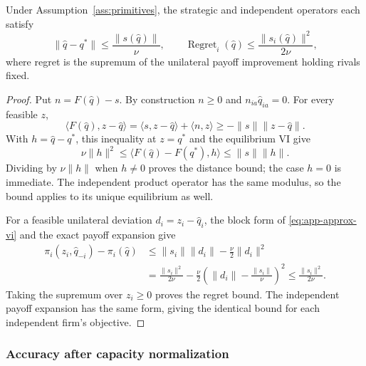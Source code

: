 \begin{proposition}\label{prop:certificate}
  Under Assumption~\ref{ass:primitives}, the strategic and
  independent operators each satisfy
  \begin{equation}\label{eq:certificate}
    \|\widehat q-q^*\|\leq\frac{\|s(\widehat q)\|}{\nu},\qquad
    \operatorname{Regret}_i(\widehat q)\leq\frac{\|s_i(\widehat q)\|^2}{2\nu},
  \end{equation}
  where regret is the supremum of the unilateral payoff improvement
  holding rivals fixed.
\end{proposition}

\begin{proof}
  Put $n=F(\widehat q)-s$.
  By construction $n\geq0$ and $n_{ia}\widehat q_{ia}=0$.
  For every feasible $z$,
  \begin{equation}\label{eq:app-approx-vi}
    \langle F(\widehat q),z-\widehat q\rangle
    =\langle s,z-\widehat q\rangle+\langle n,z\rangle
    \geq-\|s\|\|z-\widehat q\|.
  \end{equation}
  With $h=\widehat q-q^*$, this inequality at $z=q^*$ and the equilibrium VI
  give
  \begin{equation}\label{eq:app-distance-chain}
    \nu\|h\|^2\leq\langle F(\widehat q)-F(q^*),h\rangle
    \leq\|s\|\|h\|.
  \end{equation}
  Dividing by $\nu\|h\|$ when $h\ne0$ proves the distance bound; the case
  $h=0$ is immediate.
  \label{app:independent-distance}
  The independent product operator has the same modulus, so the bound applies
  to its unique equilibrium as well.

  For a feasible unilateral deviation $d_i=z_i-\widehat q_i$, the block form
  of \eqref{eq:app-approx-vi} and the exact payoff expansion give
  \begin{align}
    \pi_i(z_i,\widehat q_{-i})-\pi_i(\widehat q)
    &\leq\|s_i\|\|d_i\|-\tfrac\nu2\|d_i\|^2\nonumber\\
    &=\frac{\|s_i\|^2}{2\nu}
    -\frac\nu2\left(\|d_i\|-\frac{\|s_i\|}{\nu}\right)^2
    \leq\frac{\|s_i\|^2}{2\nu}.\label{eq:app-regret-square}
  \end{align}
  Taking the supremum over $z_i\geq0$ proves the regret bound.
  \label{app:independent-regret}
  The independent payoff expansion has the same form, giving the identical
  bound for each independent firm's objective.
\end{proof}

\subsubsection{Accuracy after capacity normalization}\label{app:observation}

